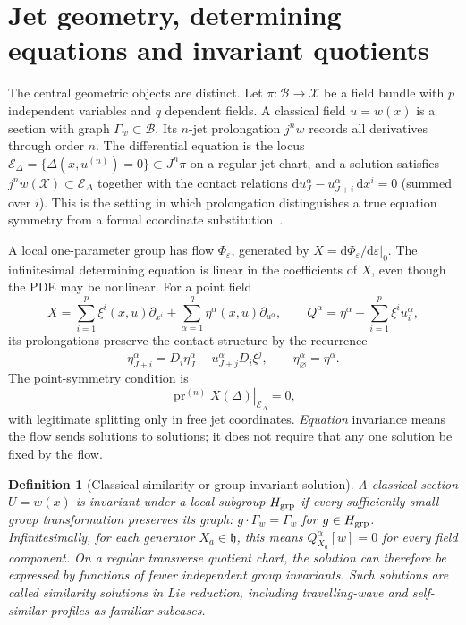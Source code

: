 \documentclass[12pt,a4paper,oneside]{report}
\numberwithin{equation}{chapter}
\newtheorem{definition}[theorem]{Definition}
\theoremstyle{remark}\newtheorem{remark}[theorem]{Remark}
\begin{document}
\section{Jet geometry, determining equations and invariant quotients}
The central geometric objects are distinct. Let $\pi:\mathcal B\to\mathcal X$
be a field bundle with $p$ independent variables and $q$ dependent fields.
A classical field $u=w(x)$ is a section with graph
$\Gamma_w\subset\mathcal B$. Its $n$-jet prolongation $j^nw$ records all
derivatives through order $n$. The differential equation is the locus
$\mathscr E_\Delta=\{\Delta(x,u^{(n)})=0\}\subset J^n\pi$ on a regular
jet chart, and a solution satisfies
$j^nw(\mathcal X)\subset\mathscr E_\Delta$ together with the contact
relations $\mathrm du^\alpha_J-u^\alpha_{J+i}\,\mathrm dx^i=0$ (summed over $i$).
This is the setting in which prolongation distinguishes a true equation
symmetry from a formal coordinate substitution~\cite{olver,anderson2000}.

A local one-parameter group has flow $\Phi_\varepsilon$, generated by
$X=\left.\mathrm d\Phi_\varepsilon/\mathrm d\varepsilon\right|_0$.
The infinitesimal determining equation is linear in the coefficients of
$X$, even though the PDE may be nonlinear. For a point field
\begin{equation}\label{eq:vectorfield-intro}
 X=\sum_{i=1}^p\xi^i(x,u)\partial_{x^i}
  +\sum_{\alpha=1}^q\eta^\alpha(x,u)\partial_{u^\alpha},
 \qquad Q^\alpha=\eta^\alpha-\sum_{i=1}^p\xi^i u_i^\alpha,
\end{equation}
its prolongations preserve the contact structure by the recurrence
\begin{equation}\label{eq:prolong}
 \eta^\alpha_{J+i}=D_i\eta^\alpha_J-u^\alpha_{J+j}D_i\xi^j,
 \qquad \eta^\alpha_{\varnothing}=\eta^\alpha.
\end{equation}
The point-symmetry condition is
\begin{equation}\label{eq:lie-criterion}
  \left.\operatorname{pr}^{(n)}X(\Delta)\right|_{\mathscr E_\Delta}=0,
\end{equation}
with legitimate splitting only in free jet coordinates. \emph{Equation}
invariance means the flow sends solutions to solutions; it does not require
that any one solution be fixed by the flow.

\begin{definition}[Classical similarity or group-invariant solution]
A classical section $U=w(x)$ is invariant under a local subgroup
$H_{\rm grp}$ if every sufficiently small group transformation preserves
its graph: $g\cdot\Gamma_w=\Gamma_w$ for $g\in H_{\rm grp}$.
Infinitesimally, for each generator $X_a\in\mathfrak h$, this means
$Q_{X_a}^\alpha[w]=0$ for every field component. On a regular transverse
quotient chart, the solution can therefore be expressed by functions of
fewer independent group invariants. Such solutions are called
\emph{similarity solutions} in Lie reduction, including travelling-wave
and self-similar profiles as familiar subcases.
\end{definition}
\end{document}
